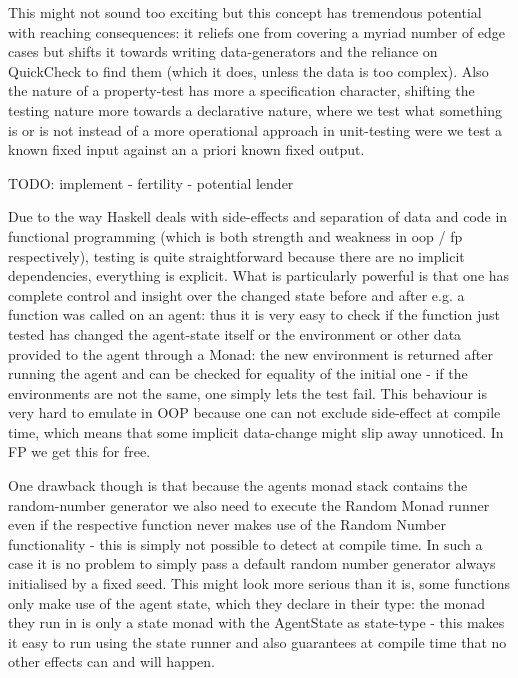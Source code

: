 This might not sound too exciting but this concept has tremendous potential with reaching consequences: it reliefs one from covering a myriad number of edge cases but shifts it towards writing data-generators and the reliance on QuickCheck to find them (which it does, unless the data is too complex). Also the nature of a property-test has more a specification character, shifting the testing nature more towards a declarative nature, where we test what something is or is not instead of a more operational approach in unit-testing were we test a known fixed input against an a priori known fixed output. 

TODO: implement
- fertility
- potential lender

Due to the way Haskell deals with side-effects and separation of data and code in functional programming (which is both strength and weakness in oop / fp respectively), testing is quite straightforward because there are no implicit dependencies, everything is explicit. What is particularly powerful is that one has complete control and insight over the changed state before and after e.g. a function was called on an agent: thus it is very easy to check if the function just tested has changed the agent-state itself or the environment or other data provided to the agent through a Monad: the new environment is returned after running the agent and can be checked for equality of the initial one - if the environments are not the same, one simply lets the test fail. This behaviour is very hard to emulate in OOP because one can not exclude side-effect at compile time, which means that some implicit data-change might slip away unnoticed. In FP we get this for free.

One drawback though is that because the agents monad stack contains the random-number generator we also need to execute the Random Monad runner even if the respective function never makes use of the Random Number functionality - this is simply not possible to detect at compile time. In such a case it is no problem to simply pass a default random number generator always initialised by a fixed seed. This might look more serious than it is, some functions only make use of the agent state, which they declare in their type: the monad they run in is only a state monad with the AgentState as state-type - this makes it easy to run using the state runner and also guarantees at compile time that no other effects can and will happen.

